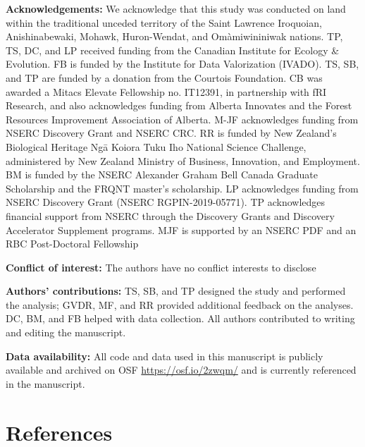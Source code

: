\documentclass[11pt]{article}
\begin{document}
\textbf{Acknowledgements:} We acknowledge that this study was conducted
on land within the traditional unceded territory of the Saint Lawrence
Iroquoian, Anishinabewaki, Mohawk, Huron-Wendat, and Omàmiwininiwak
nations. TP, TS, DC, and LP received funding from the Canadian Institute
for Ecology \& Evolution. FB is funded by the Institute for Data
Valorization (IVADO). TS, SB, and TP are funded by a donation from the
Courtois Foundation. CB was awarded a Mitacs Elevate Fellowship no.
IT12391, in partnership with fRI Research, and also acknowledges funding
from Alberta Innovates and the Forest Resources Improvement Association
of Alberta. M-JF acknowledges funding from NSERC Discovery Grant and
NSERC CRC. RR is funded by New Zealand's Biological Heritage Ngā Koiora
Tuku Iho National Science Challenge, administered by New Zealand
Ministry of Business, Innovation, and Employment. BM is funded by the
NSERC Alexander Graham Bell Canada Graduate Scholarship and the FRQNT
master's scholarship. LP acknowledges funding from NSERC Discovery Grant
(NSERC RGPIN-2019-05771). TP acknowledges financial support from NSERC
through the Discovery Grants and Discovery Accelerator Supplement
programs. MJF is supported by an NSERC PDF and an RBC Post-Doctoral
Fellowship

\textbf{Conflict of interest:} The authors have no conflict interests to
disclose

\textbf{Authors' contributions:} TS, SB, and TP designed the study and
performed the analysis; GVDR, MF, and RR provided additional feedback on
the analyses. DC, BM, and FB helped with data collection. All authors
contributed to writing and editing the manuscript.

\textbf{Data availability:} All code and data used in this manuscript is
publicly available and archived on OSF \url{https://osf.io/2zwqm/} and
is currently referenced in the manuscript.

\hypertarget{references}{%
\section*{References}\label{references}}
\end{document}
